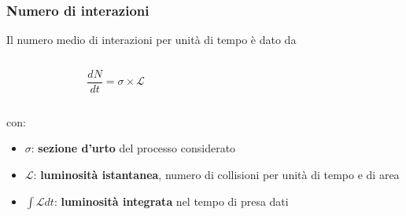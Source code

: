 \documentclass{beamer}
\begin{document}
\begin{frame}[t]
\frametitle{Numero di interazioni}


Il numero medio di interazioni per unit\`a di tempo \`e dato da\\
\medskip

\begin{columns}
\begin{column}{0.4\textwidth}
$$
\frac{dN}{dt} =\sigma \times \mathcal{L}
$$
\end{column}
\begin{column}{0.6\textwidth}
\end{column}
\end{columns}
\medskip
con:\\
\begin{itemize}
\item $\sigma$: \textbf{sezione d'urto} del processo considerato
\item $\mathcal{L}$: \textbf{luminosit\`a istantanea}, numero di collisioni 
per unit\`a di tempo e di area
\item $\int\mathcal{L}dt$: \textbf{luminosit\`a integrata} nel tempo di presa dati
\end{itemize}
\bigskip 

\end{frame}

\end{document}
